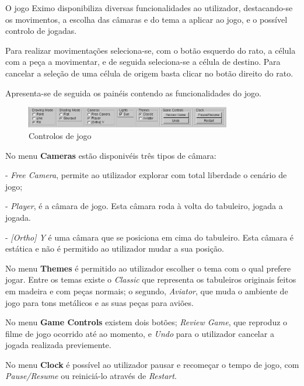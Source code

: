 \documentclass[a4paper]{article}
\begin{document}
\begin{small}
O jogo Eximo disponibiliza diversas funcionalidades ao utilizador, destacando-se os movimentos, a escolha das câmaras e do tema a aplicar ao jogo, e o possível controlo de jogadas.

Para realizar movimentações seleciona-se, com o botão esquerdo do rato, a célula com a peça a movimentar, e de seguida seleciona-se a célula de destino. Para cancelar a seleção de uma célula de origem basta clicar no botão direito do rato.

Apresenta-se de seguida os painéis contendo as funcionalidades do jogo.
\begin{figure}[h!]
   \includegraphics[width=0.8\textwidth]{res/gameControls.png}
   \caption{Controlos de jogo}
   \label{fig:9}
\end{figure}

No menu \textbf{Cameras} estão disponivéis três tipos de câmara:

	- \textit{Free Camera}, permite ao utilizador explorar com total liberdade o cenário de jogo;
	
	- \textit{Player}, é a câmara de jogo. Esta câmara roda à volta do tabuleiro, jogada a jogada.

	- \textit{[Ortho] Y} é uma câmara que se posiciona em cima do tabuleiro. Esta câmara é estática e não é permitido ao utilizador mudar a sua posição.
	

No menu \textbf{Themes} é permitido ao utilizador escolher o tema com o qual prefere jogar. Entre os temas existe o \textit{Classic} que representa os tabuleiros originais feitos em madeira e com peças normais; o segundo, \textit{Aviator}, que muda o ambiente de jogo para tons metálicos e as suas peças para aviões.

No menu \textbf{Game Controls} existem dois botões; \textit{Review Game}, que reproduz o filme de jogo ocorrido até ao momento, e \textit{Undo} para o utilizador cancelar a jogada realizada previemente.

No menu \textbf{Clock} é possível ao utilizador pausar e recomeçar o tempo de jogo, com \textit{Pause/Resume} ou reiniciá-lo através de \textit{Restart}.



\end{small}
\end{document}
